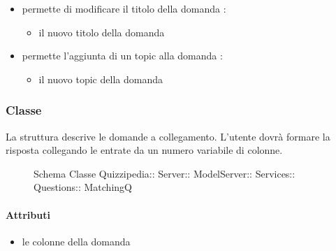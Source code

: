 \begin{itemize}
\begin{itemize}
\end{itemize}
\item {}
\newline
permette di modificare il titolo della domanda
\newline
{} :
\begin{itemize}
\item {}
\newline
il nuovo titolo della domanda
\end{itemize}
\item {}
\newline
permette l'aggiunta di un topic alla domanda
\newline
{} :
\begin{itemize}
\item {}
\newline
il nuovo topic della domanda
\end{itemize}
\end{itemize}
\subsubsection{Classe }
La struttura descrive le domande a collegamento. L'utente dovrà formare la risposta collegando le entrate da un numero variabile di colonne.
\begin{figure}[H]
\centering
\noindent{}
\caption[Schema Classe MatchingQ]{Schema Classe Quizzipedia:: Server:: ModelServer:: Services:: Questions:: MatchingQ}
\end{figure}
\paragraph{Attributi}
\begin{itemize}
\item {}
\newline
le colonne della domanda
\end{itemize}
